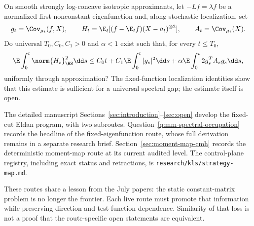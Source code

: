 \documentclass[../../main.tex]{subfiles}
\begin{document}
\begin{question}
\label{q:mm-spectral-occupation}
On smooth strongly log-concave isotropic approximants, let $-Lf=\lambda f$ be a normalized first
nonconstant eigenfunction and, along stochastic localization, set
\[
  g_t=\Cov_{\mu_t}(f,X),\qquad
  H_t=\E_t[(f-\E_tf)(X-a_t)^{\otimes2}],\qquad
  A_t=\Cov_{\mu_t}(X).
\]
Do universal $T_0,C_0,C_1>0$ and $\alpha<1$ exist such that, for every $t\le T_0$,
\[
  \E\int_0^t\norm{H_s}_{\HS}^2\dd s
  \le C_0t+C_1\E\int_0^t|g_s|^2\dd s
  +\alpha\E\int_0^t2g_s^TA_sg_s\dd s,
\]
uniformly through approximation? The fixed-function localization identities show that this
estimate is sufficient for a universal spectral gap; the estimate itself is open.
\end{question}

The detailed manuscript Sections~\ref{sec:introduction}--\ref{sec:open} develop the fixed-cut
Eldan program, with two subroutes. Question~\ref{q:mm-spectral-occupation} records the headline
of the fixed-eigenfunction route, whose full derivation remains in a separate research brief.
Section~\ref{sec:moment-map-cmh} records the deterministic moment-map route at its current audited
level. The control-plane registry, including exact status and retractions, is
\texttt{research/kls/strategy-map.md}.

These routes share a lesson from the July papers: the static constant-matrix problem is no longer
the frontier. Each live route must promote that information while preserving direction and
test-function dependence. Similarity of that loss is not a proof that the route-specific open
statements are equivalent.
\end{document}
